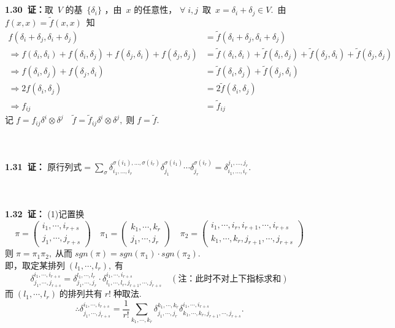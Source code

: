 \noindent
\\
\\
{\textbf{1.30\ 证：}}取\ $V$ 的基\ $\{\delta_i\}$ ，由\ $x$ 的任意性， $\forall\; i,j$\ 取\ $x=\delta_i+\delta_j \in V.$\ 由\ $f(x,x)=\tilde{f}(x,x)$\ 知
\begin{align*}
f(\delta_i+\delta_j,\delta_i+\delta_j)&=\tilde{f}(\delta_i+\delta_j,\delta_i+\delta_j)
\\
\Rightarrow f(\delta_i,\delta_i)+f(\delta_i,\delta_j)+f(\delta_j,\delta_i)+f(\delta_j,\delta_j)&=\tilde{f}(\delta_i,\delta_i)+\tilde{f}(\delta_i,\delta_j)+\tilde{f}(\delta_j,\delta_i)+\tilde{f}(\delta_j,\delta_j)
\\
\Rightarrow f(\delta_i,\delta_j)+f(\delta_j,\delta_i)&=\tilde{f}(\delta_i,\delta_j)+\tilde{f}(\delta_j,\delta_i)
\\
\Rightarrow 2f(\delta_i,\delta_j)&=2\tilde{f}(\delta_i,\delta_j)
\\
\Rightarrow f_{ij}&=\tilde{f}_{ij}
\end{align*}
记$\;f=f_{ij}\delta^i\otimes\delta^j \quad  \tilde{f}=\tilde{f}_{ij}\delta^i\otimes\delta^j,\;$则$\;f=\tilde{f}.$


\noindent
\\
\\
{\textbf{1.31\ 证：}}
原行列式$=\sum_{\sigma}\delta_{i_1,...,i_r}^{\sigma(i_1),...,\sigma(i_r)} \delta_{j_1}^{\sigma(i_1)}\cdots\delta_{j_r}^{\sigma(i_r)}=\delta_{i_1,...,i_r}^{j_1,...,j_r}.$


\noindent
\\
\\
{\textbf{1.32\ 证：}}
(1)\;记置换
$$
\pi=\left( 
         \begin{array}{l}
         i_1,\cdots , i_{r+s}
         \\
         j_1,\cdots, j_{r+s}
         \end{array}
    \right)
\quad
\pi_1=\left(
          \begin{array}{c}
          k_1,\cdots,k_r
          \\
          j_1,\cdots,j_r
          \end{array}
      \right)
\quad
\pi_2=\left(
          \begin{array}{c}
          i_1,\cdots,i_r,i_{r+1},\cdots,i_{r+s}
          \\
          k_1,\cdots,k_r,j_{r+1},\cdots,j_{r+s}
          \end{array}
      \right)
$$
则$\;\pi=\pi_1\pi_2,\;$从而$\;sgn(\pi)=sgn(\pi_1)\cdot sgn(\pi_2).$
\\
即，取定某排列$\;(l_1,\cdots,l_r),\;$有
$$
\delta_{j_1,\cdots,j_{r+s}}^{i_1,\cdots,i_{r+s}}=\delta_{j_1,\cdots,j_{r}}^{l_1,\cdots,l_r}\cdot\delta_{l_1,\cdots,l_r,j_{r+1},\cdots,j_{r+s}}^{i_1,\cdots,i_{r+s}}\quad(\text{注：此时不对上下指标求和})
$$
而$\;(l_1,\cdots,l_r)\;$的排列共有$\;r!\;$种取法.
$$\therefore \delta_{j_1,\cdots,j_{r+s}}^{i_1,\cdots,i_{r+s}}=\frac{1}{r!}\sum_{k_1,\cdots,k_r}\delta_{j_1,\cdots,j_r}^{k_1,\cdots,k_r}\delta_{k_1,\cdots,k_r,j_{r+1},\cdots,j_{r+s}}^{i_1,\cdots,i_{r+s}}.$$

